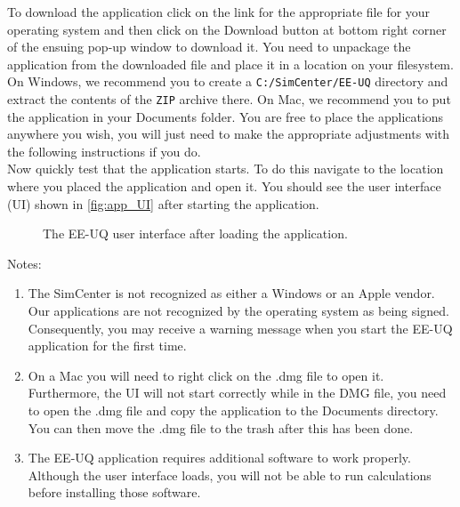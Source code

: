 To download the application click on the link for the appropriate file for your operating system  and then click on the Download button at bottom right corner of the ensuing pop-up window to download it. You need to unpackage the application from the downloaded file and place it in a location on your filesystem. On Windows, we recommend you to create a \texttt{C:/SimCenter/EE-UQ} directory and extract the contents of the \texttt{ZIP} archive there. On Mac, we recommend you to put the application in your Documents folder. You are free to place the applications anywhere you wish, you will just need to make the appropriate adjustments with the following instructions if you do. \\

Now quickly test that the application starts. To do this navigate to the location where you placed the application and open it. You should see the user interface (UI) shown in  \autoref{fig:app_UI} after starting the application.\\

\begin{figure}[!htbp]
  \caption{The EE-UQ user interface after loading the application.}
  \label{fig:app_UI}
\end{figure}

Notes: 
\begin{enumerate}
\item The SimCenter is not recognized as either a Windows or an Apple vendor. Our applications are not recognized by the operating system as being signed. Consequently, you may receive a warning message when you start the EE-UQ application for the first time.
\item  On a Mac you will need to right click on the .dmg file to open it. Furthermore, the UI will not start correctly while in the DMG file, you need to open the .dmg file and copy the application to the Documents directory. You can then move the .dmg file to the trash after this has been done.
\item  The EE-UQ application requires additional software to work properly. Although the user interface loads, you will not be able to run calculations before installing those software.
\end{enumerate}



